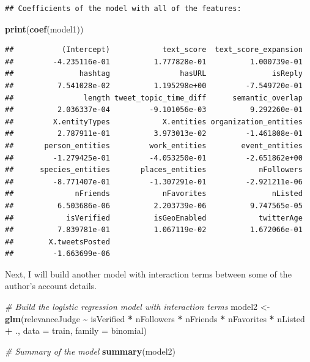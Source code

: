\documentclass[
]{article}
\newenvironment{Shaded}{\begin{snugshade}}{\end{snugshade}}
\newcommand{\AttributeTok}[1]{\textcolor[rgb]{0.13,0.29,0.53}{#1}}
\newcommand{\CommentTok}[1]{\textcolor[rgb]{0.56,0.35,0.01}{\textit{#1}}}
\newcommand{\FunctionTok}[1]{\textcolor[rgb]{0.13,0.29,0.53}{\textbf{#1}}}
\newcommand{\NormalTok}[1]{#1}
\newcommand{\OtherTok}[1]{\textcolor[rgb]{0.56,0.35,0.01}{#1}}
\newcommand{\SpecialCharTok}[1]{\textcolor[rgb]{0.81,0.36,0.00}{\textbf{#1}}}
\begin{document}
\begin{verbatim}
## Coefficients of the model with all of the features:
\end{verbatim}

\begin{Shaded}
\begin{Highlighting}[]
\FunctionTok{print}\NormalTok{(}\FunctionTok{coef}\NormalTok{(model1))}
\end{Highlighting}
\end{Shaded}

\begin{verbatim}
##           (Intercept)            text_score  text_score_expansion 
##         -4.235116e-01          1.777828e-01          1.000739e-01 
##               hashtag                hasURL               isReply 
##          7.541028e-02          1.195298e+00         -7.549720e-01 
##                length tweet_topic_time_diff      semantic_overlap 
##          2.036337e-04         -9.101056e-03          9.292260e-01 
##         X.entityTypes            X.entities organization_entities 
##          2.787911e-01          3.973013e-02         -1.461808e-01 
##       person_entities         work_entities        event_entities 
##         -1.279425e-01         -4.053250e-01         -2.651862e+00 
##      species_entities       places_entities            nFollowers 
##         -8.771407e-01         -1.307291e-01         -2.921211e-06 
##              nFriends            nFavorites               nListed 
##          6.503686e-06          2.203739e-06          9.747565e-05 
##            isVerified          isGeoEnabled            twitterAge 
##          7.839781e-01          1.067119e-02          1.672066e-01 
##        X.tweetsPosted 
##         -1.663699e-06
\end{verbatim}

Next, I will build another model with interaction terms between some of
the author's account details.

\begin{Shaded}
\begin{Highlighting}[]
\CommentTok{\# Build the logistic regression model with interaction terms}
\NormalTok{model2 }\OtherTok{\textless{}{-}} \FunctionTok{glm}\NormalTok{(relevanceJudge }\SpecialCharTok{\textasciitilde{}}\NormalTok{ isVerified }\SpecialCharTok{*}
\NormalTok{              nFollowers }\SpecialCharTok{*}
\NormalTok{              nFriends }\SpecialCharTok{*}
\NormalTok{              nFavorites }\SpecialCharTok{*}
\NormalTok{              nListed }\SpecialCharTok{+}
\NormalTok{              .,}
              \AttributeTok{data =}\NormalTok{ train, }\AttributeTok{family =}\NormalTok{ binomial)}

\CommentTok{\# Summary of the model}
\FunctionTok{summary}\NormalTok{(model2)}
\end{Highlighting}
\end{Shaded}
\end{document}
